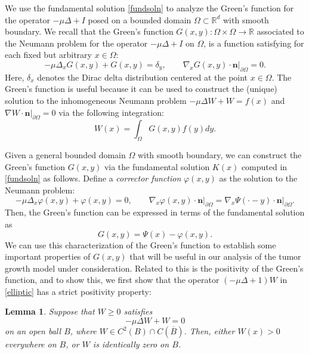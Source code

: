 \documentclass[12pt]{article}
\newcommand{\bd}{\boldsymbol}
\def\R{{\mathbb R}}
\theoremstyle{plain}
\newtheorem{lemma}{Lemma}[section]
\begin{document}
We use the fundamental solution \eqref{fundsoln} to analyze the Green's function for the operator $-\mu \Delta + I$ posed on a bounded domain $\Omega \subset \R^{d}$ with smooth boundary. We recall that the Green's function $G(x, y): \Omega \times \Omega \to \R$ associated to the Neumann problem for the operator $-\mu \Delta + I$ on $\Omega$, is a function satisfying for each fixed but arbitrary $x \in \Omega$:
\begin{equation*}
-\mu \Delta_{x} G(x, y) + G(x, y) = \delta_{y}, \qquad \nabla_{x}G(x, y) \cdot \bd{n}|_{\partial \Omega} = 0.
\end{equation*}
Here, $\delta_{x}$ denotes the Dirac delta distribution centered at the point $x \in \Omega$. The Green's function is useful because it can be used to construct the (unique) solution to the inhomogeneous Neumann problem $-\mu \Delta W + W = f(x)$ and $\nabla W \cdot \bd{n}|_{\partial \Omega} = 0$ via the following integration:
\begin{equation*}
W(x) = \int_{\Omega} G(x, y) f(y) dy.
\end{equation*}

Given a general bounded domain $\Omega$ with smooth boundary, we can construct the Green's function $G(x, y)$ via the fundamental solution $K(x)$ computed in \eqref{fundsoln} as follows. Define a \textit{corrector function} $\varphi(x, y)$ as the solution to the Neumann problem:
\begin{equation}\label{corrector}
-\mu \Delta_{x} \varphi(x, y) + \varphi(x, y) = 0, \qquad \nabla_{x} \varphi(x, y) \cdot \bd{n}|_{\partial \Omega} = \nabla_{x} \Psi(\cdot - y) \cdot \bd{n} \Big\vert_{\partial \Omega}.
\end{equation}
Then, the Green's function can be expressed in terms of the fundamental solution as
\begin{equation*}
G(x, y) = \Psi(x) - \varphi(x, y).
\end{equation*}
We can use this characterization of the Green's function to establish some important properties of $G(x, y)$ that will be useful in our analysis of the tumor growth model under consideration. Related to this is the positivity of the Green's function, and to show this, we first show that the operator $(-\mu \Delta + 1)W$ in \eqref{elliptic} has a strict positivity property:

\begin{lemma}\label{ellipticmax}
    Suppose that $W \ge 0$ satisfies
    \begin{equation}\label{ellipticzero}
    -\mu\Delta W + W = 0
    \end{equation}
    on an open ball $B$, where $W \in C^{2}(B) \cap C(\overline{B})$. Then, either $W(x) > 0$ everywhere on $B$, or $W$ is identically zero on $B$.
\end{lemma}
\end{document}
